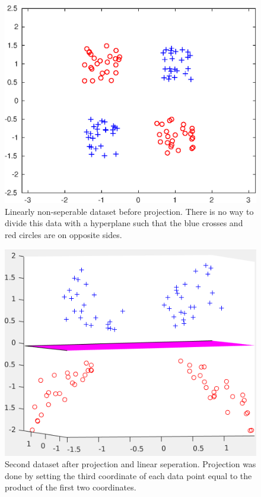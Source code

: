 \documentclass{article}
\begin{document}
	\begin{figure}[H]
		\centering
		\includegraphics{plot6}
		\caption{Linearly non-seperable dataset before projection. There is no way to divide this data with a hyperplane such that the blue crosses and red circles are on opposite sides.}
	\end{figure}
	\begin{figure}[H]
		\centering
		\includegraphics{plot7}
		\caption{Second dataset after projection and linear seperation. Projection was done by setting the third coordinate of each data point equal to the product of the first two coordinates.}
	\end{figure}
	
\end{document}
